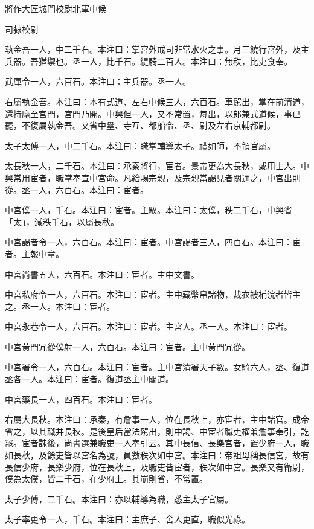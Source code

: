 
\begin{pinyinscope}
將作大匠城門校尉北軍中候

司隸校尉

執金吾一人，中二千石。本注曰：掌宮外戒司非常水火之事。月三繞行宮外，及主兵器。吾猶禦也。丞一人，比千石。緹騎二百人。本注曰：無秩，比吏食奉。

武庫令一人，六百石。本注曰：主兵器。丞一人。

右屬執金吾。本注曰：本有式道、左右中候三人，六百石。車駕出，掌在前清道，還持麾至宮門，宮門乃開。中興但一人，又不常置，每出，以郎兼式道候，事已罷，不復屬執金吾。又省中壘、寺互、都船令、丞、尉及左右京輔都尉。

太子太傅一人，中二千石。本注曰：職掌輔導太子。禮如師，不領官屬。

太長秋一人，二千石。本注曰：承秦將行，宦者。景帝更為大長秋，或用士人。中興常用宦者，職掌奉宣中宮命。凡給賜宗親，及宗親當謁見者關通之，中宮出則從。丞一人，六百石。本注曰：宦者。

中宮僕一人，千石。本注曰：宦者。主馭。本注曰：太僕，秩二千石，中興省「太」，減秩千石，以屬長秋。

中宮謁者令一人，六百石。本注曰：宦者。中宮謁者三人，四百石。本注曰：宦者。主報中章。

中宮尚書五人，六百石。本注曰：宦者。主中文書。

中宮私府令一人，六百石。本注曰：宦者。主中藏幣帛諸物，裁衣被補浣者皆主之。丞一人。本注曰：宦者。

中宮永巷令一人，六百石。本注曰：宦者。主宮人。丞一人。本注曰：宦者。

中宮黃門冗從僕射一人，六百石。本注曰：宦者。主中黃門冗從。

中宮署令一人，六百石。本注曰：宦者。主中宮清署天子數。女騎六人，丞、復道丞各一人。本注曰：宦者。復道丞主中閣道。

中宮藥長一人，四百石。本注曰：宦者。

右屬大長秋。本注曰：承秦，有詹事一人，位在長秋上，亦宦者，主中諸官。成帝省之，以其職并長秋。是後皇后當法駕出，則中謁、中宦者職吏權兼詹事奉引，訖罷。宦者誅後，尚書選兼職吏一人奉引云。其中長信、長樂宮者，置少府一人，職如長秋，及餘吏皆以宮名為號，員數秩次如中宮。本注曰：帝祖母稱長信宮，故有長信少府，長樂少府，位在長秋上，及職吏皆宦者，秩次如中宮。長樂又有衛尉，僕為太僕，皆二千石，在少府上。其崩則省，不常置。

太子少傅，二千石。本注曰：亦以輔導為職，悉主太子官屬。

太子率更令一人，千石。本注曰：主庶子、舍人更直，職似光祿。


\end{pinyinscope}
